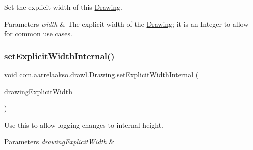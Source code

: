 Set the explicit width of this \hyperlink{classcom_1_1aarrelaakso_1_1drawl_1_1_drawing}{Drawing}. 


\begin{DoxyParams}{Parameters}
{\em width} & The explicit width of the \hyperlink{classcom_1_1aarrelaakso_1_1drawl_1_1_drawing}{Drawing}; it is an Integer to allow for common use cases. \\
\hline
\end{DoxyParams}
\mbox{\label{classcom_1_1aarrelaakso_1_1drawl_1_1_drawing_a062d982652f679941892b0669fafa640}} 
\subsubsection{\texorpdfstring{set\+Explicit\+Width\+Internal()}{setExplicitWidthInternal()}}
{\footnotesize\ttfamily void com.\+aarrelaakso.\+drawl.\+Drawing.\+set\+Explicit\+Width\+Internal (\begin{DoxyParamCaption}\item[{@Not\+Null \hyperlink{classcom_1_1aarrelaakso_1_1drawl_1_1_drawl_number}{Drawl\+Number}}]{drawing\+Explicit\+Width }\end{DoxyParamCaption})\hspace{0.3cm}{\ttfamily [private]}}



Use this to allow logging changes to internal height. 


\begin{DoxyParams}{Parameters}
{\em drawing\+Explicit\+Width} & \\
\hline
\end{DoxyParams}
\mbox{\label{classcom_1_1aarrelaakso_1_1drawl_1_1_drawing_ae6230a0043cb9a05bd33419c5c136b80}} 
